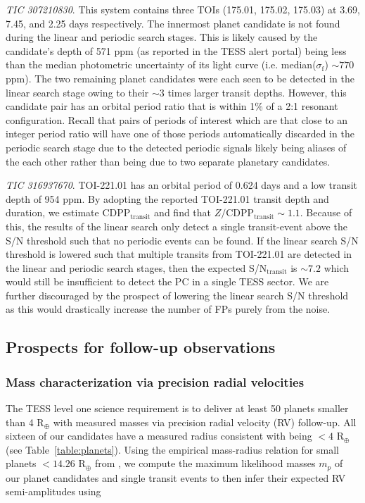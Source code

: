 \emph{TIC 307210830}. This system contains three TOIs (175.01, 175.02, 175.03) at 3.69, 7.45,
and 2.25 days respectively. The innermost planet candidate is not found during the linear and
periodic search stages. This is likely caused by the candidate's depth of 571 ppm
(as reported in the TESS alert portal) being less than the median photometric uncertainty of
its light curve (i.e. median($\sigma_{\text{f}}$) $\sim 770$ ppm). The two remaining planet candidates were each seen
to be detected in the \pipeline{} linear search stage owing to their $\sim 3$ times larger
transit depths. However, this candidate pair has an orbital period ratio that is within 1\%
of a 2:1 resonant configuration. Recall that pairs of periods of interest which are that close to
an integer period ratio will have one of those periods automatically discarded in the periodic search
stage due to the detected periodic signals likely being aliases of the each other rather than being
due to two separate planetary candidates.


\emph{TIC 316937670}. TOI-221.01 has an orbital period of 0.624 days and a low transit depth
of 954 ppm. By adopting the reported TOI-221.01 transit depth and duration, we estimate
CDPP$_{\text{transit}}$ and find that $Z/\text{CDPP}_{\text{transit}} \sim 1.1$. Because of this,
the results of the \pipeline{} linear search only detect
a single transit-event above the S/N threshold such that
no periodic events can be found. If the linear search S/N threshold is lowered
such that multiple transits from TOI-221.01 are detected in the linear and periodic search stages, then
the expected S/N$_{\text{transit}}$ is $\sim 7.2$ which would still be insufficient to detect the PC in
a single TESS sector. We are further discouraged by the prospect of lowering the linear search S/N
threshold as this would drastically increase the number of FPs purely from the noise.


\subsection{Prospects for follow-up observations}
\subsubsection{Mass characterization via precision radial velocities} \label{sect:rv}
The TESS level one science requirement is to deliver at least 50 planets smaller than 4
R$_{\oplus}$ with measured masses via precision radial velocity (RV) follow-up. All sixteen of our
candidates have a measured radius consistent with being $<4$ R$_{\oplus}$ (see Table~\ref{table:planets}).
Using the empirical mass-radius relation for small planets $<14.26$ R$_{\oplus}$ from \cite{chen17},
we compute the maximum likelihood masses $m_p$ of our planet candidates and single transit events
to then infer their expected RV semi-amplitudes using 

